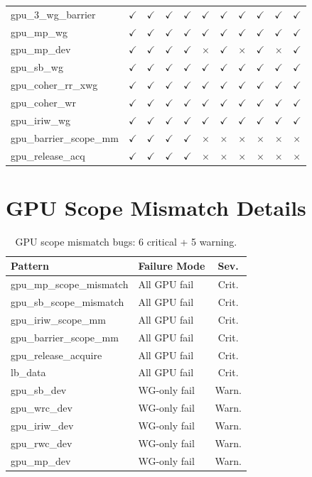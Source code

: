 \documentclass[11pt]{article}
\newcommand{\cmark}{$\checkmark$}
\newcommand{\xmark}{$\times$}
\begin{document}
{\begin{longtable}{l cccc cccccc}
gpu\_3\_wg\_barrier & \cmark & \cmark & \cmark & \cmark & \cmark & \cmark & \cmark & \cmark & \cmark & \cmark \\
gpu\_mp\_wg & \cmark & \cmark & \cmark & \cmark & \cmark & \cmark & \cmark & \cmark & \cmark & \cmark \\
gpu\_mp\_dev & \cmark & \cmark & \cmark & \cmark & \xmark & \cmark & \xmark & \cmark & \xmark & \cmark \\
gpu\_sb\_wg & \cmark & \cmark & \cmark & \cmark & \cmark & \cmark & \cmark & \cmark & \cmark & \cmark \\
gpu\_coher\_rr\_xwg & \cmark & \cmark & \cmark & \cmark & \cmark & \cmark & \cmark & \cmark & \cmark & \cmark \\
gpu\_coher\_wr & \cmark & \cmark & \cmark & \cmark & \cmark & \cmark & \cmark & \cmark & \cmark & \cmark \\
gpu\_iriw\_wg & \cmark & \cmark & \cmark & \cmark & \cmark & \cmark & \cmark & \cmark & \cmark & \cmark \\
gpu\_barrier\_scope\_mm & \cmark & \cmark & \cmark & \cmark & \xmark & \xmark & \xmark & \xmark & \xmark & \xmark \\
gpu\_release\_acq & \cmark & \cmark & \cmark & \cmark & \xmark & \xmark & \xmark & \xmark & \xmark & \xmark \\
\bottomrule
\end{longtable}
}

\section{GPU Scope Mismatch Details}
\label{app:gpu-scope-details}

\begin{table}[ht]
\centering
\caption{GPU scope mismatch bugs: 6 critical + 5 warning.}
\small
\begin{tabular}{llc}
\toprule
\textbf{Pattern} & \textbf{Failure Mode} & \textbf{Sev.} \\
\midrule
gpu\_mp\_scope\_mismatch & All GPU fail & Crit. \\
gpu\_sb\_scope\_mismatch & All GPU fail & Crit. \\
gpu\_iriw\_scope\_mm & All GPU fail & Crit. \\
gpu\_barrier\_scope\_mm & All GPU fail & Crit. \\
gpu\_release\_acquire & All GPU fail & Crit. \\
lb\_data & All GPU fail & Crit. \\
\midrule
gpu\_sb\_dev & WG-only fail & Warn. \\
gpu\_wrc\_dev & WG-only fail & Warn. \\
gpu\_iriw\_dev & WG-only fail & Warn. \\
gpu\_rwc\_dev & WG-only fail & Warn. \\
gpu\_mp\_dev & WG-only fail & Warn. \\
\bottomrule
\end{tabular}
\end{table}
\end{document}
